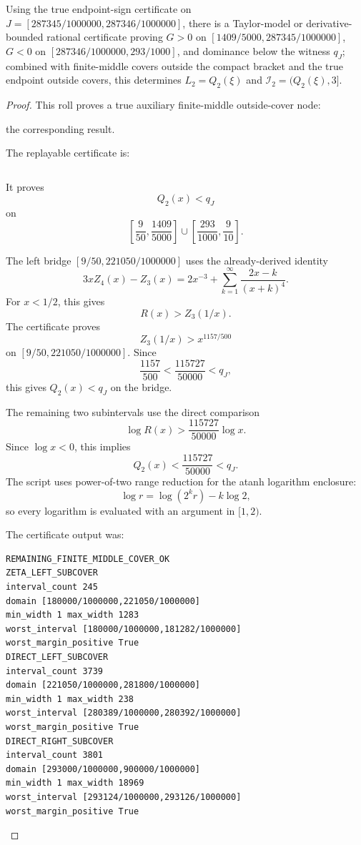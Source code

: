 \begin{proposition}
\label{res:q2-compact-taylor-monotonicity-j-terminal-certificate}
Using the true endpoint-sign certificate on \(J=[287345/1000000,287346/1000000]\), there is a Taylor-model or derivative-bounded rational certificate proving \(G>0\) on \([1409/5000,287345/1000000]\), \(G<0\) on \([287346/1000000,293/1000]\), and dominance below the witness \(q_J\); combined with finite-middle covers outside the compact bracket and the true endpoint outside covers, this determines \(L_2=Q_2(\xi)\) and \(\mathcal I_2=(Q_2(\xi),3]\).
\end{proposition}
\begin{proof}
This roll proves a true auxiliary finite-middle outside-cover node:

the corresponding result.

The replayable certificate is:

\begin{verbatim}
\end{verbatim}

It proves
\[
Q_2(x)<q_J
\]
on
\[
\left[\frac9{50},\frac{1409}{5000}\right]
\cup
\left[\frac{293}{1000},\frac9{10}\right].
\]

The left bridge \([9/50,221050/1000000]\) uses the already-derived identity
\[
3xZ_4(x)-Z_3(x)
=2x^{-3}+\sum_{k=1}^{\infty}\frac{2x-k}{(x+k)^4}.
\]
For \(x<1/2\), this gives
\[
R(x)>Z_3(1/x).
\]
The certificate proves
\[
Z_3(1/x)>x^{1157/500}
\]
on \([9/50,221050/1000000]\). Since
\[
\frac{1157}{500}<\frac{115727}{50000}<q_J,
\]
this gives \(Q_2(x)<q_J\) on the bridge.

The remaining two subintervals use the direct comparison
\[
\log R(x)>\frac{115727}{50000}\log x.
\]
Since \(\log x<0\), this implies
\[
Q_2(x)<\frac{115727}{50000}<q_J.
\]
The script uses power-of-two range reduction for the atanh logarithm enclosure:
\[
\log r=\log(2^k r)-k\log 2,
\]
so every logarithm is evaluated with an argument in \([1,2)\).

The certificate output was:

\begin{verbatim}
REMAINING_FINITE_MIDDLE_COVER_OK
ZETA_LEFT_SUBCOVER
interval_count 245
domain [180000/1000000,221050/1000000]
min_width 1 max_width 1283
worst_interval [180000/1000000,181282/1000000]
worst_margin_positive True
DIRECT_LEFT_SUBCOVER
interval_count 3739
domain [221050/1000000,281800/1000000]
min_width 1 max_width 238
worst_interval [280389/1000000,280392/1000000]
worst_margin_positive True
DIRECT_RIGHT_SUBCOVER
interval_count 3801
domain [293000/1000000,900000/1000000]
min_width 1 max_width 18969
worst_interval [293124/1000000,293126/1000000]
worst_margin_positive True
\end{verbatim}


\end{proof}
